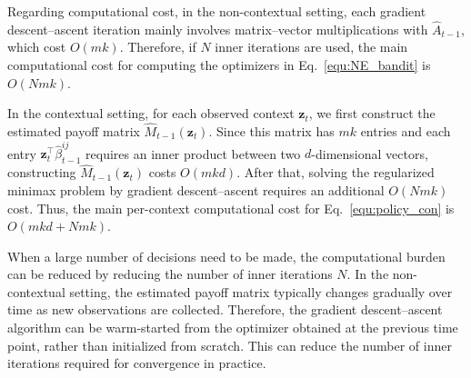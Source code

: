 \documentclass[12pt]{article}
\begin{document}
Regarding computational cost, in the non-contextual setting, each gradient descent--ascent iteration mainly involves matrix--vector multiplications with $\widehat A_{t-1}$, which cost $O(mk)$. Therefore, if $N$ inner iterations are used, the main computational cost for computing the optimizers in Eq.~\eqref{equ:NE_bandit} is $O(Nmk)$.

In the contextual setting, for each observed context $\bm{z}_t$, we first construct the estimated payoff matrix $\widehat M_{t-1}(\bm{z}_t)$. Since this matrix has $mk$ entries and each entry $\bm{z}_t^\top\widehat\beta_{t-1}^{ij}$ requires an inner product between two $d$-dimensional vectors, constructing $\widehat M_{t-1}(\bm{z}_t)$ costs $O(mkd)$. After that, solving the regularized minimax problem by gradient descent--ascent requires an additional $O(Nmk)$ cost. Thus, the main per-context computational cost for Eq.~\eqref{equ:policy_con} is $O(mkd + Nmk)$.

When a large number of decisions need to be made, the computational burden can be reduced by reducing the number of inner iterations $N$. In the non-contextual setting, the estimated payoff matrix typically changes gradually over time as new observations are collected. Therefore, the gradient descent--ascent algorithm can be warm-started from the optimizer obtained at the previous time point, rather than initialized from scratch. This can reduce the number of inner iterations required for convergence in practice.
\end{document}
